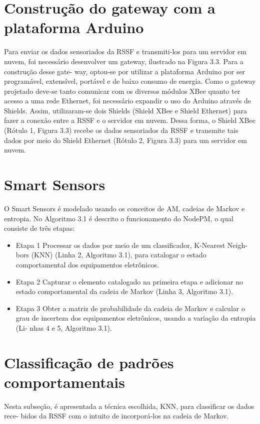 \section{Construção do gateway com a plataforma Arduino}

Para enviar os dados sensoriados da RSSF e transmiti-los para um servidor em nuvem, foi necessário desenvolver um gateway, ilustrado na Figura 3.3. Para a construção desse gate- way, optou-se por utilizar a plataforma Arduino por ser programável, extensível, portável e de baixo consumo de energia.
Como o gateway projetado deve-se tanto comunicar com os diversos módulos XBee quanto ter acesso a uma rede Ethernet, foi necessário expandir o uso do Arduino através de Shields. Assim, utilizaram-se dois Shields (Shield XBee e Shield Ethernet) para fazer a conexão entre a RSSF e o servidor em nuvem. Dessa forma, o Shield XBee (Rótulo 1, Figura 3.3) recebe os dados sensoriados da RSSF e transmite tais dados por meio do Shield Ethernet (Rótulo 2, Figura 3.3) para um servidor em nuvem.

\section{Smart Sensors}

O Smart Sensors é modelado usando os conceitos de AM, cadeias de Markov e entropia. No
Algoritmo 3.1 é descrito o funcionamento do NodePM, o qual consiste de três etapas:

\begin{itemize}
	\item{Etapa 1} Processar os dados por meio de um classificador, K-Nearest Neigh- bors (KNN) (Linha 2, Algoritmo 3.1), para catalogar o estado comportamental dos equipamentos eletrônicos.
	\item{Etapa 2} Capturar o elemento catalogado na primeira etapa e adicionar no estado comportamental da cadeia de Markov (Linha 3, Algoritmo 3.1).
	\item{Etapa 3} Obter a matriz de probabilidade da cadeia de Markov e calcular o grau de incerteza dos equipamentos eletrônicos, usando a variação da entropia (Li- nhas 4 e 5, Algoritmo 3.1).
\end{itemize}


\section{Classificação de padrões comportamentais}
Nesta subseção, é apresentada a técnica escolhida, KNN, para classificar os dados rece- bidos da RSSF com o intuito de incorporá-los na cadeia de Markov.




